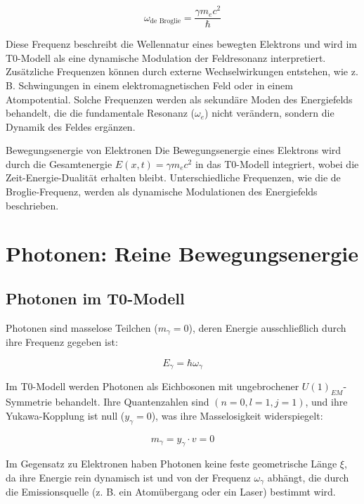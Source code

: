 	\begin{equation}
		\omega_{\text{de Broglie}} = \frac{\gamma m_e c^2}{\hbar}
	\end{equation}
	
	Diese Frequenz beschreibt die Wellennatur eines bewegten Elektrons und wird im T0-Modell als eine dynamische Modulation der Feldresonanz interpretiert. Zusätzliche Frequenzen können durch externe Wechselwirkungen entstehen, wie z. B. Schwingungen in einem elektromagnetischen Feld oder in einem Atompotential. Solche Frequenzen werden als sekundäre Moden des Energiefelds behandelt, die die fundamentale Resonanz (\(\omega_e\)) nicht verändern, sondern die Dynamik des Feldes ergänzen.
	
	\begin{important}{Bewegungsenergie von Elektronen}{}
		Die Bewegungsenergie eines Elektrons wird durch die Gesamtenergie \( E(x,t) = \gamma m_e c^2 \) in das T0-Modell integriert, wobei die Zeit-Energie-Dualität erhalten bleibt. Unterschiedliche Frequenzen, wie die de Broglie-Frequenz, werden als dynamische Modulationen des Energiefelds beschrieben.
	\end{important}
	
	\section{Photonen: Reine Bewegungsenergie}
	\label{sec:photon_energy}
	
	\subsection{Photonen im T0-Modell}
	\label{subsec:photon_model}
	
	Photonen sind masselose Teilchen (\( m_\gamma = 0 \)), deren Energie ausschließlich durch ihre Frequenz gegeben ist:
	
	\begin{equation}
		E_\gamma = \hbar \omega_\gamma
	\end{equation}
	
	Im T0-Modell werden Photonen als Eichbosonen mit ungebrochener \( U(1)_{EM} \)-Symmetrie behandelt. Ihre Quantenzahlen sind \((n=0, l=1, j=1)\), und ihre Yukawa-Kopplung ist null (\( y_\gamma = 0 \)), was ihre Masselosigkeit widerspiegelt:
	
	\begin{equation}
		m_\gamma = y_\gamma \cdot v = 0
	\end{equation}
	
	Im Gegensatz zu Elektronen haben Photonen keine feste geometrische Länge \(\xi\), da ihre Energie rein dynamisch ist und von der Frequenz \(\omega_\gamma\) abhängt, die durch die Emissionsquelle (z. B. ein Atomübergang oder ein Laser) bestimmt wird.
	
